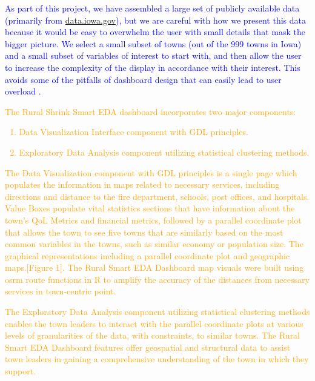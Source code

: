 \documentclass[10pt]{article}\usepackage[]{graphicx}\usepackage[]{color}
\newcommand{\db}[1]{{\textcolor{orange}{#1}}}
\newcommand{\svp}[1]{{\textcolor{blue}{#1}}}
\begin{document}
\svp{As part of this project, we have assembled a large set of publicly available data (primarily from \url{data.iowa.gov}), but we are careful with how we present this data because it would be easy to overwhelm the user with small details that mask the bigger picture. We select a small subset of towns (out of the 999 towns in Iowa) and a small subset of variables of interest to start with, and then allow the user to increase the complexity of the display in accordance with their interest. This avoids some of the pitfalls of dashboard design that can easily lead to user overload \cite{few}.}


\db{The Rural Shrink Smart EDA dashboard incorporates two major components: 
  \begin{enumerate}
  \item{Data Visualization Interface component with GDL principles.} 
  \item{Exploratory Data Analysis component utilizing statistical clustering methods.}
  \end{enumerate} }

\db{ The Data Visualization component with GDL principles is a single page which populates the information in maps related to necessary services, including directions and distance to the fire department, schools, post offices, and hospitals. Value Boxes populate vital statistics sections that have information about the town's QoL Metrics and financial metrics, followed by a parallel coordinate plot that allows the town to see five towns that are similarly based on the most common variables in the towns, such as similar economy or population size. The graphical representations including a parallel coordinate plot and geographic maps.[Figure 1]. The Rural Smart EDA Dashboard map visuals were built using osrm route functions in R to amplify the accuracy of the distances from necessary services in town-centric point.}

\db{The Exploratory Data Analysis component utilizing statistical clustering methods enables the town leaders to interact with the parallel coordinate plots at various levels of granularities of the data, with constraints, to similar towns. The Rural Smart EDA Dashboard features offer geospatial and  structural data to assist town leaders in gaining a comprehensive understanding of the town in which they support. }
\end{document}
